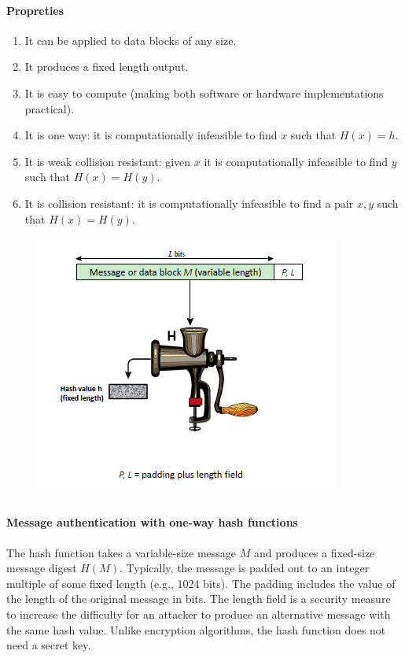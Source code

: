 \documentclass{article}
\begin{document}
                                    \paragraph{Propreties}
                                    \begin{enumerate}
                                        \item It can be applied to data blocks of any size.
                                        \item It produces a fixed length output.
                                        \item It is easy to compute (making both software or hardware implementations practical).
                                        \item It is one way: it is computationally infeasible to find \( x \) such that \( H(x) = h \).
                                        \item It is weak collision resistant: given \( x \) it is computationally infeasible to find \( y \) such that \( H(x) = H(y) \).
                                        \item It is collision resistant: it is computationally infeasible to find a pair \( x, y \) such that \( H(x) = H(y) \).
                                    \end{enumerate}
                                    \begin{figure}
                                        \includegraphics{../immagini/hash function.png}
                                    \end{figure}
                                    \paragraph{Message authentication with one-way hash functions}
                                    The hash function takes a variable-size message \( M \) and produces a fixed-size message digest \( H(M) \). Typically, the message is padded out to an integer multiple of some fixed length (e.g., 1024 bits). The padding includes the value of the length of the original message in bits. The length field is a security measure to increase the difficulty for an attacker to produce an alternative message with the same hash value. Unlike encryption algorithms, the hash function does not need a secret key.
\end{document}
